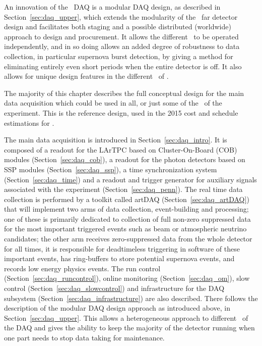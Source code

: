 An innovation of the \LBNE\ DAQ is a modular DAQ design,
as described in Section~\ref{sec:daq_upper}, which extends the
modularity of the \LBNE\ far detector design and facilitates both
staging and a possible distributed (worldwide) approach to design and
procurement.   It allows the different \COMPARTMENTS\ to be
operated independently, and in so doing allows an added degree of
robustness to data collection, in particular supernova burst
detection, by giving a method for eliminating entirely even short
periods when the entire detector is off.  It also allows for unique 
design features %
in the different \COMPARTMENTS\ 
of \LBNE.

The majority of this chapter describes the full conceptual design for
the main data acquisition which could be used in all, or just some of
the \COMPARTMENTS\ of the experiment.  This is the reference design,
used in the 2015 cost and schedule estimations for \LBNE.  


The main data acquisition is introduced in
Section~\ref{sec:daq_intro}.  It is composed of a readout for the
LArTPC based on Cluster-On-Board (COB) modules (Section~\ref{sec:daq_cob}), a readout for
the photon detectors based on SSP modules (Section~\ref{sec:daq_ssp}),
a time synchronization system (Section~\ref{sec:daq_time}) and a
readout and trigger generator for auxiliary signals associated with
the experiment (Section~\ref{sec:daq_penn}).  The real time data
collection is performed by a toolkit called artDAQ
(Section~\ref{sec:daq_artDAQ}) that will implement two arms of data
collection, event-building and processing; 
one of these is primarily dedicated to collection of full non-zero
suppressed data for the most important triggered events such as beam
or atmospheric neutrino candidates;  the other arm receives
zero-suppressed data from the whole detector for all times, it is responsible for
deadtimeless triggering in software of these important events, has ring-buffers to
store potential supernova events, and records low energy physics events.
The run control
(Section~\ref{sec:daq_runcontrol}), online monitoring
(Section~\ref{sec:daq_om}), slow control
(Section~\ref{sec:daq_slowcontrol}) and infrastructure for the DAQ
subsystem (Section~\ref{sec:daq_infrastructure}) are also described.
There follows the description of the modular DAQ design approach
as introduced above, in Section~\ref{sec:daq_upper}.  This allows a
heterogeneous approach to different \COMPARTMENTS\ of the DAQ and
gives the ability to keep the majority of the detector running when
one part needs to stop data taking for maintenance.

